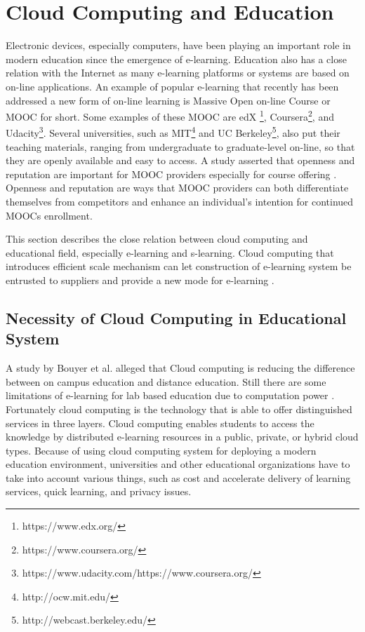 \documentclass[journal]{vgtc}
\begin{document}
\section{Cloud Computing and Education}
Electronic devices, especially computers, have been playing an important role in modern education since the emergence of e-learning. Education also has a close relation with the Internet as many e-learning platforms or systems are based on on-line applications. An example of popular e-learning that recently has been addressed a new form of on-line learning is Massive Open on-line Course or MOOC for short\cite{Margaryan2014}. Some examples of these MOOC are edX \footnote{https://www.edx.org/}, Coursera\footnote{https://www.coursera.org/}, and Udacity\footnote{https://www.udacity.com/https://www.coursera.org/}. Several universities, such as MIT\footnote{http://ocw.mit.edu/} and UC Berkeley\footnote{http://webcast.berkeley.edu/}, also put their teaching materials, ranging from undergraduate to graduate-level on-line, so that they are openly available and easy to access. A study asserted that openness and reputation are important for MOOC providers especially for course offering \cite{Alraimi2014}. Openness and reputation are ways that MOOC providers can both differentiate themselves from competitors and enhance an individual's intention for continued MOOCs enrollment.

This section describes the close relation between cloud computing and educational field, especially e-learning and s-learning. Cloud computing that introduces efficient scale mechanism can let construction of e-learning system be entrusted to suppliers and provide a new mode for e-learning \cite{Laisheng2011}.

  \subsection{Necessity of Cloud Computing in Educational System}
  A study by Bouyer et al. \cite{Bouyer2014} alleged that Cloud computing is reducing the difference between on campus education and distance education. Still there are some limitations of e-learning for lab based education due to computation power \cite{Bouyer2014}. Fortunately cloud computing is the technology that is able to offer distinguished services in three layers. Cloud computing enables students to access the knowledge by distributed e-learning resources in a public, private, or hybrid cloud types. Because of using cloud computing system for deploying a modern education environment, universities and other educational organizations have to take into account various things, such as cost and accelerate delivery of learning services, quick learning, and privacy issues.
\end{document}
